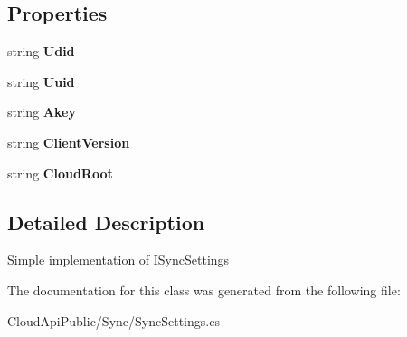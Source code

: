 \subsection*{Properties}
\begin{DoxyCompactItemize}
\item 
\hypertarget{class_cloud_api_public_1_1_sync_1_1_sync_settings_a9de02ba6b818bd3e5d8608104b549dae}{string {\bfseries Udid}}\label{class_cloud_api_public_1_1_sync_1_1_sync_settings_a9de02ba6b818bd3e5d8608104b549dae}

\item 
\hypertarget{class_cloud_api_public_1_1_sync_1_1_sync_settings_a9d3afac6e3af87dcc6eaf6f552eb2ad0}{string {\bfseries Uuid}}\label{class_cloud_api_public_1_1_sync_1_1_sync_settings_a9d3afac6e3af87dcc6eaf6f552eb2ad0}

\item 
\hypertarget{class_cloud_api_public_1_1_sync_1_1_sync_settings_ac1f86d0039b9f3a969f2bb03638ad28f}{string {\bfseries Akey}}\label{class_cloud_api_public_1_1_sync_1_1_sync_settings_ac1f86d0039b9f3a969f2bb03638ad28f}

\item 
\hypertarget{class_cloud_api_public_1_1_sync_1_1_sync_settings_a0fae13473830e2f80be2e4a9b6bf0287}{string {\bfseries Client\-Version}}\label{class_cloud_api_public_1_1_sync_1_1_sync_settings_a0fae13473830e2f80be2e4a9b6bf0287}

\item 
\hypertarget{class_cloud_api_public_1_1_sync_1_1_sync_settings_a191f66177783c1bfd7e2a789ee4f7694}{string {\bfseries Cloud\-Root}}\label{class_cloud_api_public_1_1_sync_1_1_sync_settings_a191f66177783c1bfd7e2a789ee4f7694}

\end{DoxyCompactItemize}


\subsection{Detailed Description}
Simple implementation of I\-Sync\-Settings 



The documentation for this class was generated from the following file\-:\begin{DoxyCompactItemize}
\item 
Cloud\-Api\-Public/\-Sync/Sync\-Settings.\-cs\end{DoxyCompactItemize}

